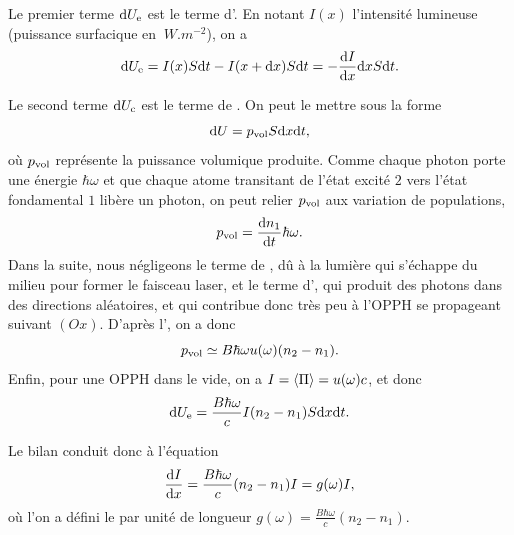\documentclass[12pt,fancy]{cours}
\begin{document}
\begin{liste}
  \item Le premier terme $\mathrm{d} U_{\rm e}$ est le terme d'. En notant $I(x)$ l'intensité lumineuse (puissance surfacique en $\SI{}{W.m^{-2}}$), on a
  \begin{equation}
  \mathrm{d} U_{\rm{e}} = I(x) S\mathrm{d} t - I(x+\mathrm{d} x)S\mathrm{d} t = -\frac{\mathrm{d}{I}}{\mathrm{d}{x}}\mathrm{d} x S \mathrm{d} t.
  \end{equation}
  \item  Le second terme $\mathrm{d} U_{\rm c}$ est le terme de . On peut le mettre sous la forme
  \begin{equation}
  \mathrm{d} U = p_{\rm vol} S\mathrm{d} x\mathrm{d} t,
  \end{equation}
  où $p_{\rm vol}$ représente la puissance volumique produite. Comme chaque photon porte une énergie $\hbar \omega$ et que chaque atome transitant de l'état excité $2$ vers l'état fondamental $1$ libère un photon, on peut relier $p_{\rm vol}$ aux variation de populations,
  \begin{equation}
    p_{\rm vol} = \frac{\mathrm{d}{n_1}}{\mathrm{d}{t}} \hbar \omega.
  \end{equation}
  Dans la suite, nous négligeons le terme de , dû à la lumière qui s'échappe du milieu pour former le faisceau laser, et le terme d', qui produit des photons dans des directions aléatoires, et qui contribue donc très peu à l'OPPH se propageant suivant $(Ox)$. D'après l', on a donc
  \begin{equation}
    p_{\rm vol} \simeq B \hbar \omega u(\omega)(n_2-n_1).
  \end{equation}
  Enfin, pour une OPPH dans le vide, on a $I = \left\langle {\Pi} \right\rangle = u(\omega) c $, et donc
  \begin{equation}
  \mathrm{d} U_{\rm{e}} = \frac{B \hbar \omega}{c} I (n_2-n_1) S\mathrm{d} x\mathrm{d} t.
  \end{equation}
\end{liste}
Le bilan conduit donc à l'équation
\begin{equation}
\frac{\mathrm{d} I}{\mathrm{d} x}=\frac{B\hbar\omega}{c}(n_2-n_1)I = g(\omega) I,
\end{equation}
où l'on a défini le  par unité de longueur $g(\omega)=\frac{B\hbar\omega}{c}(n_2-n_1)$.
\end{document}
